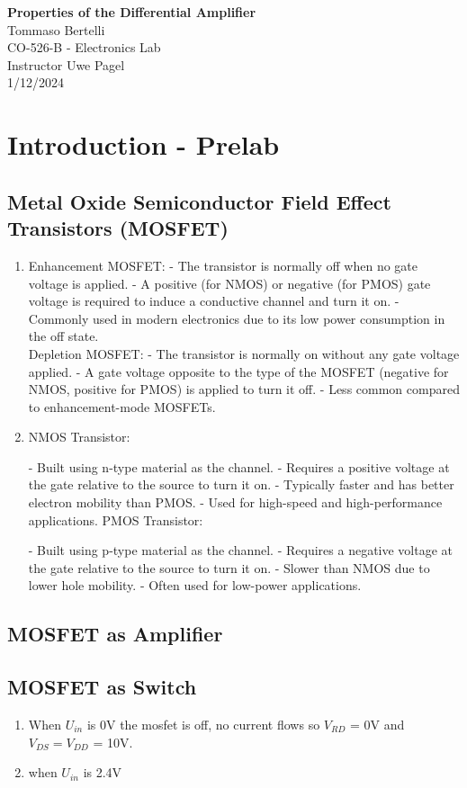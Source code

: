 \documentclass{article}
\begin{document}
	
	\mbox{}
	\vspace{10cm}
	\begin{center}
		\textbf{\Huge{Properties of the Differential Amplifier}}\\
		\bigskip
		\Large{Tommaso Bertelli}\\
		\bigskip
		\Large{CO-526-B - Electronics Lab}\\
		\bigskip
		\Large{Instructor Uwe Pagel}\\
		\bigskip
		\Large{1/12/2024}\\
	\end{center}
	\pagebreak
	
	\section{Introduction - Prelab}
		\subsection{Metal Oxide Semiconductor Field Effect Transistors (MOSFET)}
			\begin{enumerate}
				\item 
				Enhancement MOSFET:
				- The transistor is normally off when no gate voltage is applied.
				- A positive (for NMOS) or negative (for PMOS) gate voltage is required to induce a conductive channel and turn it on.
				- Commonly used in modern electronics due to its low power consumption in the off state.\\
				Depletion MOSFET:		
				- The transistor is normally on without any gate voltage applied.
				- A gate voltage opposite to the type of the MOSFET (negative for NMOS, positive for PMOS) is applied to turn it off.
				- Less common compared to enhancement-mode MOSFETs.
				\item 
				NMOS Transistor:
				
				- Built using n-type material as the channel.
				- Requires a positive voltage at the gate relative to the source to turn it on.
				- Typically faster and has better electron mobility than PMOS.
				- Used for high-speed and high-performance applications.
				PMOS Transistor:
				
				- Built using p-type material as the channel.
				- Requires a negative voltage at the gate relative to the source to turn it on.
				- Slower than NMOS due to lower hole mobility.
				- Often used for low-power applications.
			\end{enumerate}
		\subsection{MOSFET as Amplifier}
		\subsection{MOSFET as Switch}
		\begin{enumerate}
			\item When \(U_{in}\) is 0V the mosfet is off, no current flows so \(V_{RD}\) = 0V and \(V_{DS} = V_{DD}\) = 10V.
			\item  when \(U_{in}\) is 2.4V 
		\end{enumerate}
	
\end{document}
